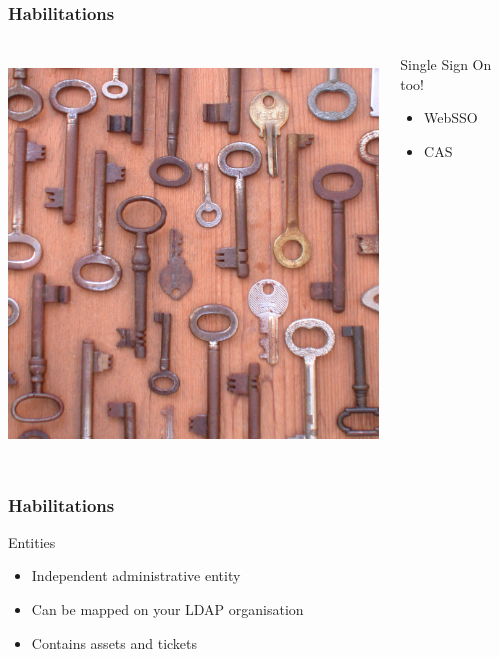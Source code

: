 \documentclass{beamer}
\begin{document}
\begin{frame}
    \frametitle{Habilitations}


 \begin{columns}
 \begin{column}{0.34\textwidth}
    \includegraphics[height=10.5cm]{pics/sso.jpg}
 \end{column}
 \begin{column}{0.90\textwidth}
    \begin{block}{Single Sign On too!}
        \begin{itemize}
            \item WebSSO
            \item CAS
        \end{itemize}
    \end{block}
 \end{column}
\end{columns}

\end{frame}




\begin{frame}
\frametitle{Habilitations}
    \begin{block}{Entities}
        \begin{itemize}
            \item Independent administrative entity
            \item Can be mapped on your LDAP organisation
            \item Contains assets and tickets
        \end{itemize}

    \end{block}
\end{frame}
\end{document}
